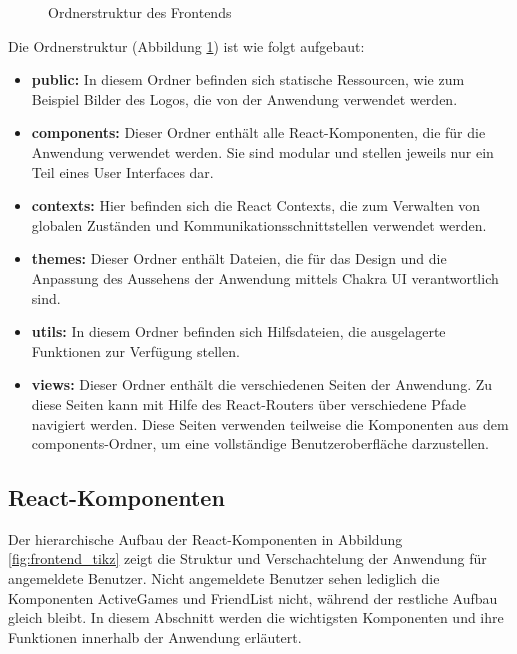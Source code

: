 \begin{figure}[h!]
\centering

\begin{minipage}{0.5\textwidth}
\end{minipage}
\caption{Ordnerstruktur des Frontends}
\label{fig:frontend_dirtree}

\end{figure}

Die Ordnerstruktur (Abbildung \ref{fig:frontend_dirtree}) ist wie folgt aufgebaut:
\begin{itemize}
\item \textbf{public:} In diesem Ordner befinden sich statische Ressourcen, wie zum Beispiel Bilder des Logos, die von der Anwendung verwendet werden.
\item \textbf{components:} Dieser Ordner enthält alle React-Komponenten, die für die Anwendung verwendet werden. Sie sind modular und stellen jeweils nur ein Teil eines User Interfaces dar.
\item \textbf{contexts:} Hier befinden sich die React Contexts, die zum Verwalten von globalen Zuständen und Kommunikationsschnittstellen verwendet werden.
\item \textbf{themes:} Dieser Ordner enthält Dateien, die für das Design und die Anpassung des Aussehens der Anwendung mittels Chakra UI verantwortlich sind.
\item \textbf{utils:} In diesem Ordner befinden sich Hilfsdateien, die ausgelagerte Funktionen zur Verfügung stellen.
\item \textbf{views:} Dieser Ordner enthält die verschiedenen Seiten der Anwendung. Zu diese Seiten kann mit Hilfe des React-Routers über verschiedene Pfade navigiert werden. Diese Seiten verwenden teilweise die Komponenten aus dem components-Ordner, um eine vollständige Benutzeroberfläche darzustellen.
\end{itemize}
    
        \subsection{React-Komponenten}
        \label{sec:React-Komponenten}
Der hierarchische Aufbau der React-Komponenten in Abbildung \ref{fig:frontend_tikz} zeigt die Struktur und Verschachtelung der Anwendung für angemeldete Benutzer. Nicht angemeldete Benutzer sehen lediglich die Komponenten ActiveGames und FriendList nicht, während der restliche Aufbau gleich bleibt. In diesem Abschnitt werden die wichtigsten Komponenten und ihre Funktionen innerhalb der Anwendung erläutert.
        
